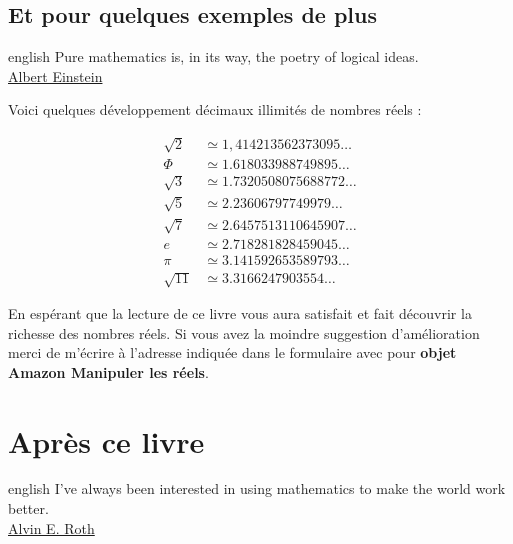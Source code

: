 \documentclass[a4paper, 11pt, twoside]{book}
\begin{document}
\chapter{Et pour quelques exemples de plus}
\label{sec:orgdfc5b8e}
\startcontents[level-2]

\begin{foreigndisplayquote}{english}
Pure mathematics is, in its way, the poetry of logical ideas.\\
\href{https://en.wikipedia.org/wiki/Albert\_Einstein}{Albert Einstein}   
\end{foreigndisplayquote}

Voici quelques développement décimaux illimités de nombres réels :

\begin{align*}
\sqrt{2} &\simeq 1,414213562373095\dots\\
\Phi &\simeq 1.618033988749895\dots\\
\sqrt{3} &\simeq 1.7320508075688772\dots\\
\sqrt{5} &\simeq 2.23606797749979\dots\\
\sqrt{7} &\simeq 2.6457513110645907\dots\\
e &\simeq 2.718281828459045\dots\\
\pi &\simeq 3.141592653589793\dots \\
\sqrt{11} &\simeq 3.3166247903554\dots
\end{align*}

En espérant que la lecture de ce livre vous aura satisfait et fait
découvrir la richesse des nombres réels. Si vous avez la moindre
suggestion d'amélioration merci de m'écrire à l'adresse
indiquée dans le formulaire avec pour \textbf{objet Amazon Manipuler les réels}.
\stopcontents[level-2]
\stopcontents[level-1]

\part{Après ce livre}
\label{sec:org877c75b}
\startcontents[level-1]
\begin{foreigndisplayquote}{english}
I’ve always been interested in using mathematics to make the world
work better.\\

\href{https://en.wikipedia.org/wiki/Alvin\_E.\_Roth}{Alvin E. Roth}
\end{foreigndisplayquote}
\end{document}
